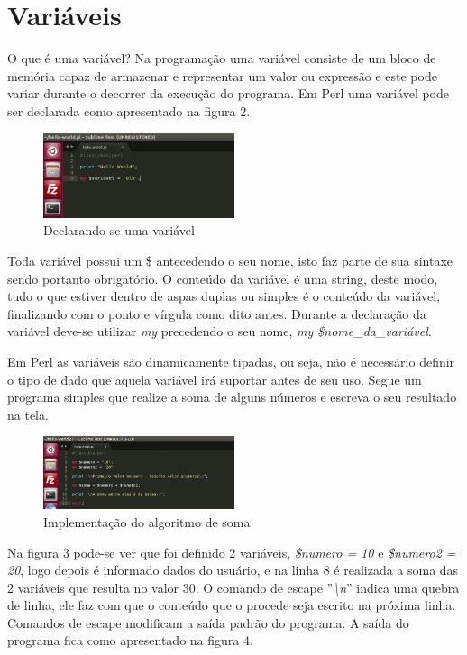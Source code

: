 \chapter{Vari\'aveis}
O que \'e uma vari\'avel? Na programa\c{c}\~ao uma variável consiste de um bloco de mem\'oria capaz de armazenar e representar um valor ou express\~ao e este 
pode variar durante o decorrer da execu\c{c}\~ao do programa. Em Perl uma vari\'avel pode ser declarada como apresentado na figura 2. 

\begin{figure}[!htb]
	\centering
	\includegraphics[width=0.5\textwidth]{../5_figuras/image2}
	\caption{Declarando-se uma vari\'avel}
\end{figure}

Toda vari\'avel possui um \$ antecedendo o seu nome, isto faz parte de sua sintaxe sendo portanto obrigat\'orio. O conte\'udo da vari\'avel \'e uma string, 
deste modo, tudo o que estiver dentro de aspas duplas ou simples \'e o conte\'udo da vari\'avel, finalizando com o ponto e v\'irgula como dito antes. Durante
a declara\c{c}\~ao da vari\'avel deve-se utilizar \textit{my} precedendo o seu nome, \textit{my \$nome\_da\_vari\'avel}.

Em Perl as vari\'aveis s\~ao dinamicamente tipadas, ou seja, n\~ao \'e necess\'ario definir o tipo de dado que aquela vari\'avel ir\'a suportar antes de 
seu uso. Segue um programa simples que realize a soma de alguns n\'umeros e escreva o seu resultado na tela.

\begin{figure}[!htb]
	\centering
	\includegraphics[width=0.5\textwidth]{../5_figuras/image3}
	\caption{Implementa\c{c}\~ao do algoritmo de soma}
\end{figure}

Na figura 3 pode-se ver que foi definido 2 vari\'aveis, \textit{\$numero = 10} e \textit{\$numero2 = 20}, logo depois \'e informado dados do usu\'ario, e 
na linha 8 \'e realizada a soma das 2 vari\'aveis que resulta no valor 30. O comando de escape ''\textit{\textbackslash n}'' indica uma quebra de linha, ele 
faz com que o conte\'udo que o procede seja escrito na pr\'oxima linha. Comandos de escape modificam a sa\'ida padr\~ao do programa. A sa\'ida do programa 
fica como apresentado na figura 4.

